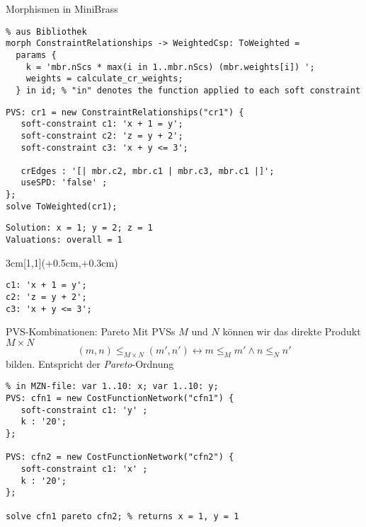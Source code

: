 \begin{frame}[fragile]{Morphismen in MiniBrass}
\begin{lstlisting}
% aus Bibliothek
morph ConstraintRelationships -> WeightedCsp: ToWeighted = 
  params {
    k = 'mbr.nScs * max(i in 1..mbr.nScs) (mbr.weights[i]) ';
    weights = calculate_cr_weights;
  } in id; % "in" denotes the function applied to each soft constraint 
\end{lstlisting}
\begin{lstlisting}   
PVS: cr1 = new ConstraintRelationships("cr1") {
   soft-constraint c1: 'x + 1 = y';
   soft-constraint c2: 'z = y + 2';
   soft-constraint c3: 'x + y <= 3';
   
   crEdges : '[| mbr.c2, mbr.c1 | mbr.c3, mbr.c1 |]';
   useSPD: 'false' ;
}; 
solve ToWeighted(cr1);
\end{lstlisting}
\begin{Verbatim}[fontsize=\small]
Solution: x = 1; y = 2; z = 1
Valuations: overall = 1
\end{Verbatim}
\begin{textblock*}{3cm}[1,1](\textwidth+0.5cm,\textheight+0.3cm)
\begin{center}
\begin{Verbatim}[fontsize=\small]
c1: 'x + 1 = y';
c2: 'z = y + 2';
c3: 'x + y <= 3';   
\end{Verbatim}

\end{center}
\end{textblock*}

\end{frame}

\begin{frame}[fragile]{PVS-Kombinationen: Pareto} \small
Mit PVSs $M$ und $N$ können wir das direkte Produkt $M \times N$ 
\[
(m, n) \leq_{M \times N} (m', n') \leftrightarrow m \leq_M m' \wedge n \leq_N n'
\]
bilden. Entspricht der \emph{Pareto}-Ordnung
\begin{lstlisting}
% in MZN-file: var 1..10: x; var 1..10: y;
PVS: cfn1 = new CostFunctionNetwork("cfn1") {
   soft-constraint c1: 'y' ;
   k : '20';
}; 

PVS: cfn2 = new CostFunctionNetwork("cfn2") {
   soft-constraint c1: 'x' ;
   k : '20';
}; 

solve cfn1 pareto cfn2; % returns x = 1, y = 1
\end{lstlisting}
\end{frame}

